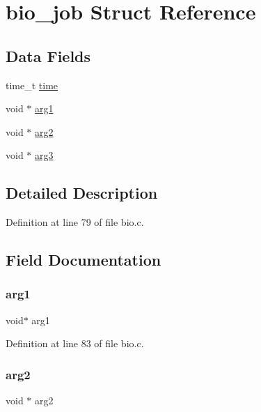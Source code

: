 \hypertarget{structbio__job}{}\section{bio\+\_\+job Struct Reference}
\label{structbio__job}
\subsection*{Data Fields}
\begin{DoxyCompactItemize}
\item 
time\+\_\+t \hyperlink{structbio__job_ab842bdb7d02be824fb48613032b4ff36}{time}
\item 
void $\ast$ \hyperlink{structbio__job_a9cec6236d6845e5d537a7052e2018461}{arg1}
\item 
void $\ast$ \hyperlink{structbio__job_a018e28f301c79a4512596db6ead532f3}{arg2}
\item 
void $\ast$ \hyperlink{structbio__job_a3fe71d88fd8b45ddfbdf347c3c69b485}{arg3}
\end{DoxyCompactItemize}


\subsection{Detailed Description}


Definition at line 79 of file bio.\+c.



\subsection{Field Documentation}
\mbox{\label{structbio__job_a9cec6236d6845e5d537a7052e2018461}} 
\subsubsection{\texorpdfstring{arg1}{arg1}}
{\footnotesize\ttfamily void$\ast$ arg1}



Definition at line 83 of file bio.\+c.

\mbox{\label{structbio__job_a018e28f301c79a4512596db6ead532f3}} 
\subsubsection{\texorpdfstring{arg2}{arg2}}
{\footnotesize\ttfamily void $\ast$ arg2}




